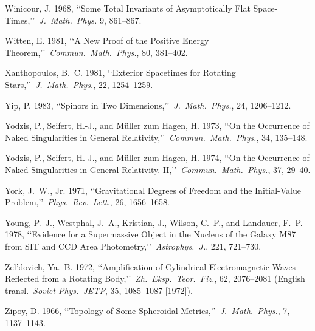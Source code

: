 \item Winicour, J. 1968, \lq\lq Some Total Invariants of Asymptotically Flat Space-Times,\rq\rq\ \emph{J.\ Math.\ Phys.} 9, 861--867.
\item Witten, E. 1981, \lq\lq A New Proof of the Positive Energy Theorem,\rq\rq\ \emph{Commun.\ Math.\ Phys.}, 80, 381--402.
\item Xanthopoulos, B.~C. 1981, \lq\lq Exterior Spacetimes for Rotating Stars,\rq\rq\ \emph{J.\ Math.\ Phys.}, 22, 1254--1259.
\item Yip, P. 1983, \lq\lq Spinors in Two Dimensions,\rq\rq\ \emph{J.\ Math.\ Phys.}, 24, 1206--1212.
\item Yodzis, P., Seifert, H.-J., and M{\"u}ller zum Hagen, H. 1973, \lq\lq On the Occurrence of Naked Singularities in General Relativity,\rq\rq\ \emph{Commun.\ Math.\ Phys.}, 34, 135--148.
\item Yodzis, P., Seifert, H.-J., and M{\"u}ller zum Hagen, H. 1974, \lq\lq On the Occurrence of Naked Singularities in General Relativity. II,\rq\rq\ \emph{Commun.\ Math.\ Phys.}, 37, 29--40.
\item York, J.~W., Jr. 1971, \lq\lq Gravitational Degrees of Freedom and the Initial-Value Problem,\rq\rq\ \emph{Phys.\ Rev.\ Lett.}, 26, 1656--1658.
\item Young, P.~J., Westphal, J.~A., Kristian, J., Wilson, C.~P., and Landauer, F.~P. 1978, \lq\lq Evidence for a Supermassive Object in the Nucleus of the Galaxy M87 from SIT and CCD Area Photometry,\rq\rq\ \emph{Astrophys.\ J.}, 221, 721--730.
\item Zel'dovich, Ya.~B. 1972, \lq\lq Amplification of Cylindrical Electromagnetic Waves Reflected from a Rotating Body,\rq\rq\ \emph{Zh.\ Eksp.\ Teor.\ Fiz.}, 62, 2076--2081 (English transl.\ \emph{Soviet Phys.--JETP}, 35, 1085--1087 [1972]).
\item Zipoy, D. 1966, \lq\lq Topology of Some Spheroidal Metrics,\rq\rq\ \emph{J.\ Math.\ Phys.}, 7, 1137--1143.

